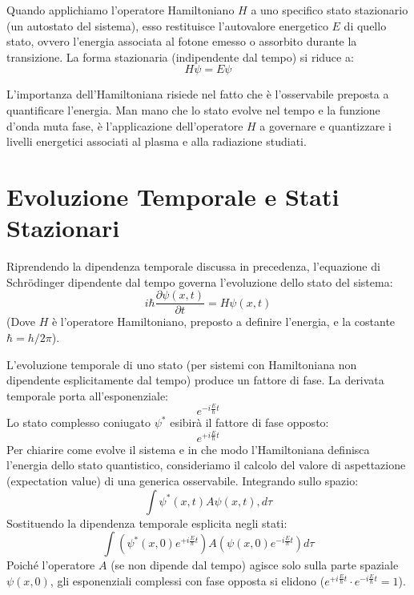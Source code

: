 Quando applichiamo l'operatore Hamiltoniano $H$ a uno specifico stato stazionario (un autostato del sistema), esso restituisce l'autovalore energetico $E$ di quello stato, ovvero l'energia associata al fotone emesso o assorbito durante la transizione. La forma stazionaria (indipendente dal tempo) si riduce a:
\begin{equation}
H \psi = E \psi
\end{equation}

L'importanza dell'Hamiltoniana risiede nel fatto che è l'osservabile preposta a quantificare l'energia. Man mano che lo stato evolve nel tempo e la funzione d'onda muta fase, è l'applicazione dell'operatore $H$ a governare e quantizzare i livelli energetici associati al plasma e alla radiazione studiati.

\section{Evoluzione Temporale e Stati Stazionari}

Riprendendo la dipendenza temporale discussa in precedenza, l'equazione di Schrödinger dipendente dal tempo governa l'evoluzione dello stato del sistema:
\begin{equation}
i \hbar \frac{\partial \psi(x,t)}{\partial t} = H \psi(x,t)
\end{equation}
(Dove $H$ è l'operatore Hamiltoniano, preposto a definire l'energia, e la costante $\hbar = h / 2\pi$).

L'evoluzione temporale di uno stato (per sistemi con Hamiltoniana non dipendente esplicitamente dal tempo) produce un fattore di fase. La derivata temporale porta all'esponenziale:
\begin{equation}
e^{-i \frac{E}{\hbar} t}
\end{equation}
Lo stato complesso coniugato $\psi^*$ esibirà il fattore di fase opposto:
\begin{equation}
e^{+i \frac{E}{\hbar} t}
\end{equation}
Per chiarire come evolve il sistema e in che modo l'Hamiltoniana definisca l'energia dello stato quantistico, consideriamo il calcolo del valore di aspettazione (expectation value) di una generica osservabile. Integrando sullo spazio:
\begin{equation}
\int \psi^*(x,t) A \psi(x,t) , d\tau
\end{equation}
Sostituendo la dipendenza temporale esplicita negli stati:
\begin{equation}
\int \left( \psi^*(x,0) e^{+i \frac{E}{\hbar} t} \right) A \left( \psi(x,0) e^{-i \frac{E}{\hbar} t} \right) d\tau
\end{equation}
Poiché l'operatore $A$ (se non dipende dal tempo) agisce solo sulla parte spaziale $\psi(x,0)$, gli esponenziali complessi con fase opposta si elidono ($e^{+i \frac{E}{\hbar} t} \cdot e^{-i \frac{E}{\hbar} t} = 1$).

